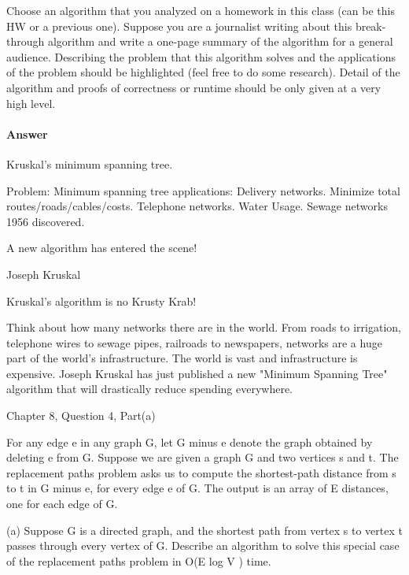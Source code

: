 \documentclass{article}
\begin{document}

\collab{\todo{}}
\nextprob{}

Choose an algorithm that you analyzed on a homework in this class (can be this
HW or a previous one).  Suppose you are a journalist writing about this
break-through algorithm and write a one-page summary of the algorithm for a
general audience.  Describing the problem that this algorithm solves and the
applications of the problem should be highlighted (feel free to do some
research).  Detail of the algorithm and proofs of correctness or runtime should
be only given at a very high level.

\paragraph{Answer}

Kruskal's minimum spanning tree.

Problem: Minimum spanning tree
applications: Delivery networks. Minimize total routes/roads/cables/costs. Telephone networks. Water Usage. Sewage networks
1956 discovered.

A new algorithm has entered the scene!

Joseph Kruskal

Kruskal's algorithm is no Krusty Krab!

Think about how many networks there are in the world. From roads to irrigation,
telephone wires to sewage pipes, railroads to newspapers, networks are a huge
part of the world's infrastructure. The world is vast and infrastructure is expensive.
Joseph Kruskal has just published a new "Minimum Spanning Tree" algorithm that
will drastically reduce spending everywhere.





\collab{\todo{}}

Chapter 8, Question 4, Part(a)

For any edge e in any graph G, let G minus e denote the graph obtained by
deleting e from G. Suppose we are given a graph G and two vertices s
and t. The replacement paths problem asks us to compute the shortest-path
distance from s to t in G minus e, for every edge e of G. The output is an array
of E distances, one for each edge of G.

(a) Suppose G is a directed graph, and the shortest path from vertex s to
vertex t passes through every vertex of G. Describe an algorithm to solve
this special case of the replacement paths problem in O(E log V ) time.
\end{document}
